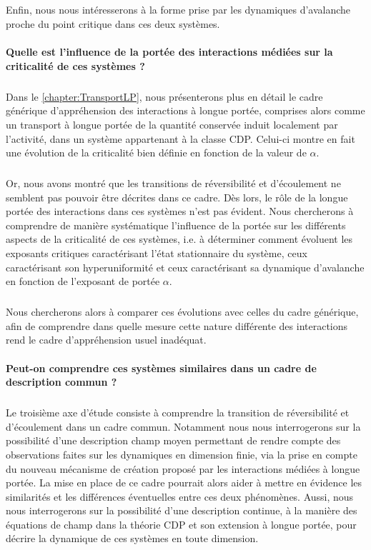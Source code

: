 \subparagraph{}Enfin, nous nous intéresserons à la forme prise par les dynamiques d'avalanche proche du point critique dans ces deux systèmes.

\paragraph{Quelle est l'influence de la portée des interactions médiées sur la criticalité de ces systèmes ?}

\subparagraph{}Dans le \autoref{chapter:TransportLP}, nous présenterons plus en détail le cadre générique d'appréhension des interactions à longue portée, comprises alors comme un transport à longue portée de la quantité conservée induit localement par l'activité, dans un système appartenant à la classe CDP. Celui-ci montre en fait une évolution de la criticalité bien définie en fonction de la valeur de $\alpha$.

\subparagraph{}Or, nous avons montré que les transitions de réversibilité et d'écoulement ne semblent pas pouvoir être décrites dans ce cadre. Dès lors, le rôle de la longue portée des interactions dans ces systèmes n'est pas évident. Nous chercherons à comprendre de manière systématique l'influence de la portée sur les différents aspects de la criticalité de ces systèmes, i.e. à déterminer comment évoluent les exposants critiques caractérisant l'état stationnaire du système, ceux caractérisant son hyperuniformité et ceux caractérisant sa dynamique d'avalanche en fonction de l'exposant de portée $\alpha$.

\subparagraph{}Nous chercherons alors à comparer ces évolutions avec celles du cadre générique, afin de comprendre dans quelle mesure cette nature différente des interactions rend le cadre d'appréhension usuel inadéquat.

\paragraph{Peut-on comprendre ces systèmes similaires dans un cadre de description commun ?}

\subparagraph{}Le troisième axe d'étude consiste à comprendre la transition de réversibilité et d'écoulement dans un cadre commun. Notamment nous nous interrogerons sur la possibilité d'une description champ moyen permettant de rendre compte des observations faites sur les dynamiques en dimension finie, via la prise en compte du nouveau mécanisme de création proposé par les interactions médiées à longue portée. La mise en place de ce cadre pourrait alors aider à mettre en évidence les similarités et les différences éventuelles entre ces deux phénomènes. Aussi, nous nous interrogerons sur la possibilité d'une description continue, à la manière des équations de champ dans la théorie CDP et son extension à longue portée, pour décrire la dynamique de ces systèmes en toute dimension.

